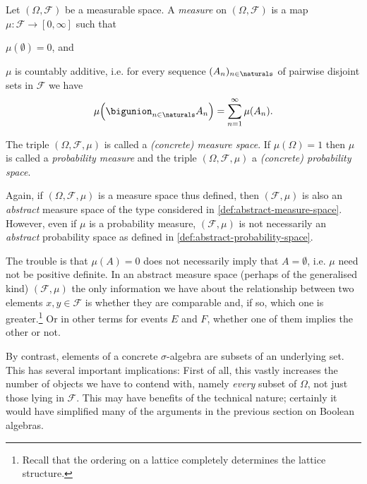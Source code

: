 \documentclass[article, a4paper, 11pt, oneside]{memoir}
\numberwithin{equation}{chapter}
\newcommand{\calF}{\mathcal{F}}
\begin{document}
\begin{definition}
    Let $(\Omega, \calF)$ be a measurable space. A \emph{measure} on $(\Omega, \calF)$ is a map $\mu \colon \calF \to [0,\infty]$ such that
    \begin{enumdef}
        \item $\mu(\emptyset) = 0$, and
        \item $\mu$ is countably additive, i.e. for every sequence $(A_n)_{n\in\naturals}$ of pairwise disjoint sets in $\calF$ we have
        \begin{equation*}
            \mu \Bigl( \bigunion_{n\in\naturals} A_n \Bigr)
                = \sum_{n=1}^\infty \mu(A_n).
        \end{equation*}
    \end{enumdef}
    The triple $(\Omega, \calF, \mu)$ is called a \emph{(concrete) measure space}. If $\mu(\Omega) = 1$ then $\mu$ is called a \emph{probability measure} and the triple $(\Omega, \calF, \mu)$ a \emph{(concrete) probability space}.
\end{definition}
%
Again, if $(\Omega, \calF, \mu)$ is a measure space thus defined, then $(\calF, \mu)$ is also an \emph{abstract} measure space of the type considered in \cref{def:abstract-measure-space}. However, even if $\mu$ is a probability measure, $(\calF, \mu)$ is not necessarily an \emph{abstract} probability space as defined in \cref{def:abstract-probability-space}.

The trouble is that $\mu(A) = 0$ does not necessarily imply that $A = \emptyset$, i.e. $\mu$ need not be positive definite. In an abstract measure space (perhaps of the generalised kind) $(\calF,\mu)$ the only information we have about the relationship between two elements $x,y \in \calF$ is whether they are comparable and, if so, which one is greater.\footnote{Recall that the ordering on a lattice completely determines the lattice structure.} Or in other terms for events $E$ and $F$, whether one of them implies the other or not.

By contrast, elements of a concrete $\sigma$-algebra are subsets of an underlying set. This has several important implications: First of all, this vastly increases the number of objects we have to contend with, namely \emph{every} subset of $\Omega$, not just those lying in $\calF$. This may have benefits of the technical nature; certainly it would have simplified many of the arguments in the previous section on Boolean algebras.
\end{document}
